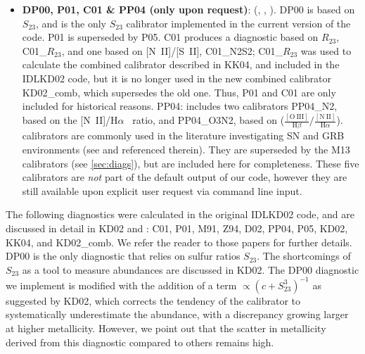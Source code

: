 \documentclass{emulateapj}
\newcommand{\ha}{\ensuremath{\mathrm{H}\alpha}}
\newcommand{\hb}{\ensuremath{\mathrm{H}\beta}}
\begin{document}
\begin{itemize}
\item{\bf DP00, P01, C01 \& PP04 (only upon request)}:
  (\citealt{diaz00}, \citealt{pilyugin01}, \citealt{charlot01}). DP00
  is based on $S_{23}$, and is the only $S_{23}$ calibrator
  implemented in the current version of the code. P01 is superseded by
  P05. C01 produces a diagnostic based on $R_{23}$, C01\_$R_{23}$, and
  one based on [N~II]/[S~II], C01\_N2S2; C01\_$R_{23}$ was used to
  calculate the combined calibrator described in KK04, and included in
  the IDLKD02 code, but it is no longer used in the new combined
  calibrator KD02\_comb, which supersedes the old one. Thus, P01 and
  C01 are only included for historical reasons.  PP04:
  \citep{pettini04} includes two calibrators PP04\_N2, based on the
        [N~II]/\ha~ ratio, and PP04\_O3N2, based on
        ($\frac{\mathrm{[O~III]}}{\hb}/\frac{\mathrm{[N~II]}}{\ha}$).
        calibrators are commonly used in the literature investigating
        SN and GRB environments (see \citealt{modjaz11} and referenced
        therein). They are superseded by the M13 calibrators (see
        \autoref{sec:diags}), but are included here for
        completeness.  These five calibrators are \emph{not} part of
        the default output of our code, however they are still
        available upon explicit user request via command line input.

\end{itemize}

The following diagnostics were calculated in the original IDLKD02
code, and are discussed in detail in KD02 and \citet{kewley08}: C01,
P01, M91, Z94, D02, PP04, P05, KD02, KK04, and KD02\_comb. We refer
the reader to those papers for further details. DP00 is the only
diagnostic that relies on sulfur ratios $S_{23}$.  The shortcomings of
$S_{23}$ as a tool to measure abundances are discussed in KD02.
The DP00 diagnostic we implement is modified with the addition of a
term $\propto (c+S_{23}^3)^{-1}$ as suggested by KD02, which corrects
the tendency of the calibrator to systematically underestimate the
abundance, with a discrepancy growing larger at higher
metallicity. However, we point out that the scatter in metallicity
derived from this diagnostic compared to others remains high.
\end{document}
